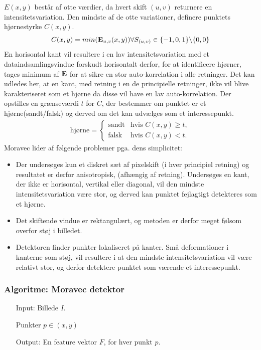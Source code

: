 $E(x,y)$ består af otte værdier, da hvert skift $(u,v)$ returnere en intensitetsvariation. Den mindste af de otte variationer, definere punktets hjørnestyrke $C(x,y)$.
$$
C(x,y)=min(\bold{E}_{u,v}(x,y)) \forall S_{(u,v)} \in \lbrace-1,0,1\rbrace \backslash \lbrace0,0\rbrace
$$
En horisontal kant vil resultere i en lav intensitetsvariation med et dataindsamlingsvindue forskudt horisontalt derfor, for at identificere hjørner, tages minimum af $\bold{E}$ for at sikre en stor auto-korrelation i alle retninger.
Det kan udledes her, at en kant, med retning i en de principielle retninger, ikke vil blive karakteriseret som et hjørne da disse vil have  en lav auto-korrelation. Der opstilles en grænseværdi $t$ for $C$, der bestemmer om punktet er et hjørne(sandt/falsk) og derved om det kan udvælges som et interessepunkt.
\begin{equation}
\begin{split}
\text{hjørne} = 
\begin{cases}
\text{sandt}& \text{hvis } C(x,y)\geq t, \\
\text{falsk }& \text{hvis } C(x,y) < t.
\end{cases}
\end{split}
\label{cornerind}
\end{equation}
Moravec lider af følgende problemer pga. dens simplicitet:
\begin{itemize}
\item{Der undersøges kun et diskret sæt af pixelskift (i hver principiel retning) og resultatet er derfor anisotropisk, (afhængig af retning). Undersøges en kant, der ikke er horisontal, vertikal eller diagonal, vil den mindste intensitetsvariation være stor, og derved kan punktet fejlagtigt detekteres som et hjørne.}
\item{Det skiftende vindue er rektangulært, og metoden er derfor meget følsom overfor støj i billedet.}
\item{Detektoren finder punkter lokaliseret på kanter. Små deformationer i kanterne som støj, vil resultere i at den mindste intensitetsvariation vil være relativt stor, og derfor detektere punktet som værende et interessepunkt.}
\end{itemize}
\subsubsection*{Algoritme: Moravec detektor}
\begin{enumerate}
\item[Input:] Billede $I$.
\item[] Punkter $p \in (x, y)$
\item[Output:] En feature vektor $F$, for hver punkt $p$.
\end{enumerate}


